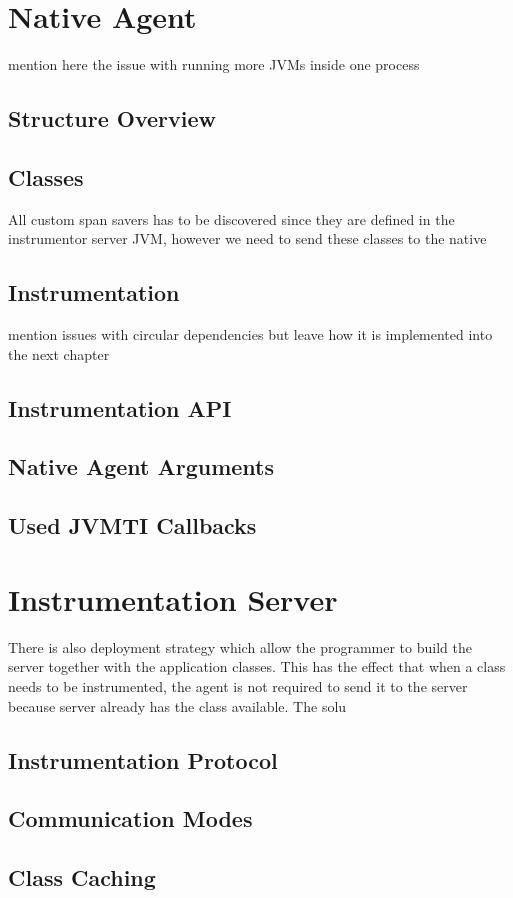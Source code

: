 \section{Native Agent}
mention here the issue with running more JVMs inside one process
\subsection{Structure Overview}
\subsection{Classes}
All custom span savers has to be discovered since they are defined in the instrumentor server JVM, however we need to send these classes to the native
\subsection{Instrumentation}
mention issues with circular dependencies but leave how it is implemented into the next chapter
\subsection{Instrumentation API}
\subsection{Native Agent Arguments}
\subsection{Used JVMTI Callbacks}
\section{Instrumentation Server}
 There is also deployment strategy which allow the programmer to build the server together with the application classes. This has the effect that when a class needs to be instrumented, the agent is not required to send it to the server because server already has the class available. The solu
\subsection{Instrumentation Protocol}
\subsection{Communication Modes}
\subsection{Class Caching}
